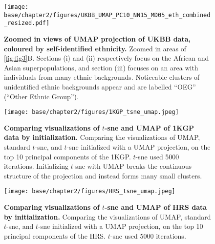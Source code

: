\newpage

\begin{figure}[ht]
    \centering
    \texttt{[image: base/chapter2/figures/UKBB\_UMAP\_PC10\_NN15\_MD05\_eth\_combined\_resized.pdf]}
    \caption[Zoomed in views of UMAP projection of UKBB data, coloured by self-identified ethnicity]{\textbf{Zoomed in views of UMAP projection of UKBB data, coloured by self-identified ethnicity.} Zoomed in areas of \ref{fig:fig3}B. Sections (i) and (ii) respectively focus on the African and Asian superpopulations, and section (iii) focuses on an area with individuals from many ethnic backgrounds. Noticeable clusters of unidentified ethnic backgrounds appear and are labelled ``OEG'' (``Other Ethnic Group'').}
    \label{fig:supp_ukbb_zoom}
\end{figure}

\newpage

\begin{figure}[!htb]
    \centering
    \texttt{[image: base/chapter2/figures/1KGP\_tsne\_umap.jpeg]}
    \caption[Comparing visualizations of $t$-sne and UMAP of 1KGP data by initialization]{\textbf{Comparing visualizations of $t$-sne and UMAP of 1KGP data by initialization.} Comparing the visualizations of UMAP, standard $t$-sne, and $t$-sne initialized with a UMAP projection, on the top 10 principal components of the 1KGP. $t$-sne used 5000 iterations. Initializing $t$-sne with UMAP breaks the continuous structure of the projection and instead forms many small clusters.}
    \label{fig:supp_tsne_umap_compare_1kgp}
\end{figure}

\newpage

\begin{figure}[!htb]
    \centering
    \texttt{[image: base/chapter2/figures/HRS\_tsne\_umap.jpeg]}
    \caption[Comparing visualizations of $t$-sne and UMAP of HRS data by initialization]{\textbf{Comparing visualizations of $t$-sne and UMAP of HRS data by initialization.} Comparing the visualizations of UMAP, standard $t$-sne, and $t$-sne initialized with a UMAP projection, on the top 10 principal components of the HRS. $t$-sne used 5000 iterations.}
    \label{fig:supp_tsne_umap_compare_hrs}
\end{figure}

\newpage

